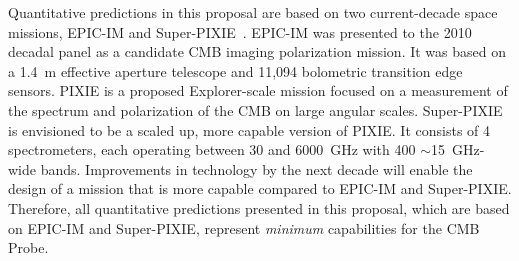 Quantitative predictions in this proposal are based on two current-decade space missions, 
EPIC-IM and Super-PIXIE~\cite{bock2009, Kogut2011PIXIE}. EPIC-IM was presented 
to the 2010 decadal panel as a candidate \ac{CMB} imaging polarization mission. 
It was based on a 1.4~m effective aperture telescope and 11,094 bolometric transition edge sensors. 
PIXIE is a proposed Explorer-scale mission focused on a measurement of the spectrum 
and polarization of the CMB on large angular scales. Super-PIXIE is envisioned to be a scaled up, 
more capable version of PIXIE. It consists of 4 spectrometers, each operating between 
30 and 6000~GHz with 400 $\sim$15~GHz-wide bands. Improvements in technology by the next decade will enable 
the design of a mission that is more capable compared to EPIC-IM and Super-PIXIE. Therefore, all 
quantitative predictions presented in this proposal, which are based on EPIC-IM and Super-PIXIE, 
represent {\it minimum} capabilities for the CMB Probe. 



